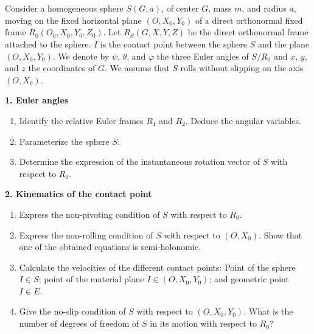 \documentclass[12pt]{article}
\begin{document}
\newpage
\section{}

Consider a homogeneous sphere $S(G, a)$, of center $G$, mass $m$, and radius $a$, moving on the fixed horizontal plane $(O, X_0, Y_0)$ of a direct orthonormal fixed frame $R_0(O_0, X_0, Y_0, Z_0)$. Let $R_S(G, X, Y, Z)$ be the direct orthonormal frame attached to the sphere. $I$ is the contact point between the sphere $S$ and the plane $(O, X_0, Y_0)$. We denote by $\psi$, $\theta$, and $\varphi$ the three Euler angles of $S/R_0$ and $x$, $y$, and $z$ the coordinates of $G$. We assume that $S$ rolls without slipping on the axis $(O, X_0)$.

\textbf{1. Euler angles}
\begin{enumerate}
    \item[a)] Identify the relative Euler frames $R_1$ and $R_2$. Deduce the angular variables.
    \item[b)] Parameterize the sphere $S$.
    \item[c)] Determine the expression of the instantaneous rotation vector of $S$ with respect to $R_0$.
\end{enumerate}

\textbf{2. Kinematics of the contact point}
\begin{enumerate}
    \item[a)] Express the non-pivoting condition of $S$ with respect to $R_0$.
    \item[b)] Express the non-rolling condition of $S$ with respect to $(O, X_0)$. Show that one of the obtained equations is semi-holonomic.
    \item[c)] Calculate the velocities of the different contact points: Point of the sphere $I \in S$; point of the material plane $I \in (O, X_0, Y_0)$; and geometric point $I \in E$.
    \item[d)] Give the no-slip condition of $S$ with respect to $(O, X_0, Y_0)$. What is the number of degrees of freedom of $S$ in its motion with respect to $R_0$?
\end{enumerate}
\end{document}
